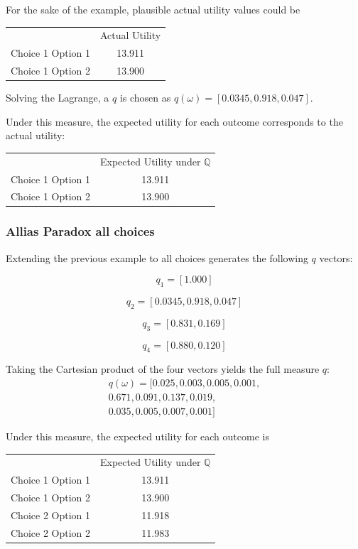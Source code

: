 \documentclass{article}
\begin{document}
For the sake of the example, plausible actual utility values could be

\begin{center}
	\begin{tabular}{c c}
		& Actual Utility \\
		Choice 1 Option 1 & 13.911 \\
		Choice 1 Option 2 & 13.900 \\
	\end{tabular}
\end{center}

Solving the Lagrange, a \(q\) is chosen as \(q(\omega)=[0.0345, 0.918, 0.047]\).

Under this measure, the expected utility for each outcome corresponds to the actual utility:

\begin{center}
	\begin{tabular}{c c}
		& Expected Utility under \(\mathbb{Q}\) \\
		Choice 1 Option 1 & 13.911 \\
		Choice 1 Option 2 & 13.900 \\
	\end{tabular}
\end{center}

\subsubsection{Allias Paradox all choices}

Extending the previous example to all choices generates the following \(q\) vectors:

\[q_1=[1.000]\]

\[q_2=[0.0345, 0.918, 0.047]\]

\[q_3=[0.831, 0.169]\]

\[q_4=[0.880, 0.120]\]

Taking the Cartesian product of the four vectors yields the full measure \(q\):
\begin{equation*}
\begin{aligned}
q(\omega)=[0.025, 0.003, 0.005, 0.001, \\
0.671, 0.091, 0.137, 0.019, \\
0.035, 0.005, 0.007, 0.001]
\end{aligned}
\end{equation*}

Under this measure, the expected utility for each outcome is

\begin{center}
	\begin{tabular}{c c}
		& Expected Utility under \(\mathbb{Q}\) \\
		Choice 1 Option 1 & 13.911 \\
		Choice 1 Option 2 & 13.900 \\
		Choice 2 Option 1 & 11.918 \\
		Choice 2 Option 2 & 11.983 \\
	\end{tabular}
\end{center}
\end{document}
